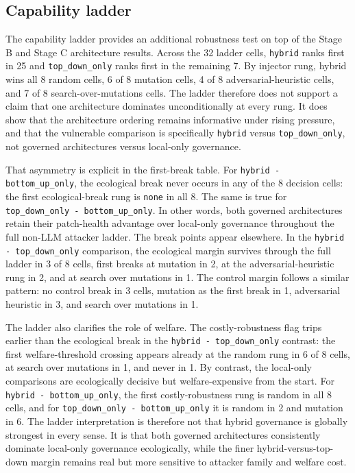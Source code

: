 \subsection{Capability ladder}

The capability ladder provides an additional robustness test on top of the Stage B and Stage C architecture results. Across the 32 ladder cells, \texttt{hybrid} ranks first in 25 and \texttt{top\_down\_only} ranks first in the remaining 7. By injector rung, hybrid wins all 8 random cells, 6 of 8 mutation cells, 4 of 8 adversarial-heuristic cells, and 7 of 8 search-over-mutations cells. The ladder therefore does not support a claim that one architecture dominates unconditionally at every rung. It does show that the architecture ordering remains informative under rising pressure, and that the vulnerable comparison is specifically \texttt{hybrid} versus \texttt{top\_down\_only}, not governed architectures versus local-only governance.

That asymmetry is explicit in the first-break table. For \texttt{hybrid - bottom\_up\_only}, the ecological break never occurs in any of the 8 decision cells: the first ecological-break rung is \texttt{none} in all 8. The same is true for \texttt{top\_down\_only - bottom\_up\_only}. In other words, both governed architectures retain their patch-health advantage over local-only governance throughout the full non-LLM attacker ladder. The break points appear elsewhere. In the \texttt{hybrid - top\_down\_only} comparison, the ecological margin survives through the full ladder in 3 of 8 cells, first breaks at mutation in 2, at the adversarial-heuristic rung in 2, and at search over mutations in 1. The control margin follows a similar pattern: no control break in 3 cells, mutation as the first break in 1, adversarial heuristic in 3, and search over mutations in 1.

The ladder also clarifies the role of welfare. The costly-robustness flag trips earlier than the ecological break in the \texttt{hybrid - top\_down\_only} contrast: the first welfare-threshold crossing appears already at the random rung in 6 of 8 cells, at search over mutations in 1, and never in 1. By contrast, the local-only comparisons are ecologically decisive but welfare-expensive from the start. For \texttt{hybrid - bottom\_up\_only}, the first costly-robustness rung is random in all 8 cells, and for \texttt{top\_down\_only - bottom\_up\_only} it is random in 2 and mutation in 6. The ladder interpretation is therefore not that hybrid governance is globally strongest in every sense. It is that both governed architectures consistently dominate local-only governance ecologically, while the finer hybrid-versus-top-down margin remains real but more sensitive to attacker family and welfare cost.

